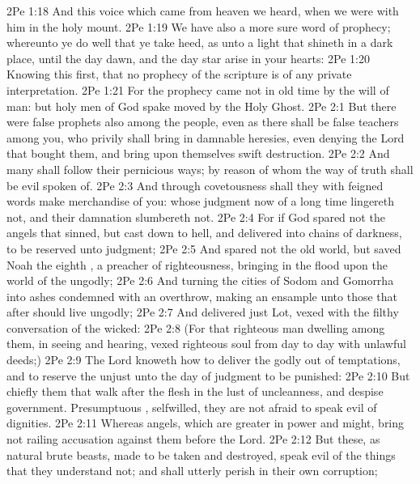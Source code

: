 \vs 2Pe 1:18 And this voice which came from heaven we heard, when we were with him in the holy mount.
\vs 2Pe 1:19 We have also a more sure word of prophecy; whereunto ye do well that ye take heed, as unto a light that shineth in a dark place, until the day dawn, and the day star arise in your hearts:
\vs 2Pe 1:20 Knowing this first, that no prophecy of the scripture is of any private interpretation.
\vs 2Pe 1:21 For the prophecy came not in old time by the will of man: but holy men of God spake  moved by the Holy Ghost.
\vs 2Pe 2:1 But there were false prophets also among the people, even as there shall be false teachers among you, who privily shall bring in damnable heresies, even denying the Lord that bought them, and bring upon themselves swift destruction.
\vs 2Pe 2:2 And many shall follow their pernicious ways; by reason of whom the way of truth shall be evil spoken of.
\vs 2Pe 2:3 And through covetousness shall they with feigned words make merchandise of you: whose judgment now of a long time lingereth not, and their damnation slumbereth not.
\vs 2Pe 2:4 For if God spared not the angels that sinned, but cast  down to hell, and delivered  into chains of darkness, to be reserved unto judgment;
\vs 2Pe 2:5 And spared not the old world, but saved Noah the eighth , a preacher of righteousness, bringing in the flood upon the world of the ungodly;
\vs 2Pe 2:6 And turning the cities of Sodom and Gomorrha into ashes condemned  with an overthrow, making  an ensample unto those that after should live ungodly;
\vs 2Pe 2:7 And delivered just Lot, vexed with the filthy conversation of the wicked:
\vs 2Pe 2:8 (For that righteous man dwelling among them, in seeing and hearing, vexed  righteous soul from day to day with  unlawful deeds;)
\vs 2Pe 2:9 The Lord knoweth how to deliver the godly out of temptations, and to reserve the unjust unto the day of judgment to be punished:
\vs 2Pe 2:10 But chiefly them that walk after the flesh in the lust of uncleanness, and despise government. Presumptuous , selfwilled, they are not afraid to speak evil of dignities.
\vs 2Pe 2:11 Whereas angels, which are greater in power and might, bring not railing accusation against them before the Lord.
\vs 2Pe 2:12 But these, as natural brute beasts, made to be taken and destroyed, speak evil of the things that they understand not; and shall utterly perish in their own corruption;
